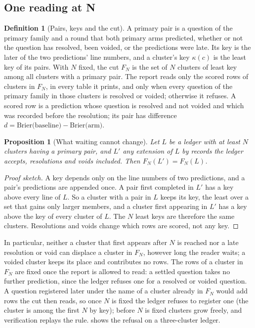\documentclass[11pt]{article}
\theoremstyle{plain}
\newtheorem{proposition}[theorem]{Proposition}
\theoremstyle{definition}
\newtheorem{definition}[theorem]{Definition}
\theoremstyle{remark}
\begin{document}
\subsection{One reading at N}\label{sec:cut}

\begin{definition}[Pairs, keys and the cut]
A primary pair is a question of the primary family and a round that both primary arms predicted,
whether or not the question has resolved, been voided, or the predictions were late. Its key is the
later of the two predictions' line numbers, and a cluster's key $\kappa(c)$ is the least key of its
pairs. With $N$ fixed, the cut $F_N$ is the set of $N$ clusters of least key among all clusters
with a primary pair. The report reads only the scored rows of clusters in $F_N$, in every table it
prints, and only when every question of the primary family in those clusters is resolved or voided;
otherwise it refuses. A scored row is a prediction whose question is resolved and not voided and
which was recorded before the resolution; its pair has difference
$d = \text{Brier(baseline)} - \text{Brier(arm)}$.
\end{definition}

\begin{proposition}[What waiting cannot change]\label{prop:cut}
Let $L$ be a ledger with at least $N$ clusters having a primary pair, and $L'$ any extension of
$L$ by records the ledger accepts, resolutions and voids included. Then $F_N(L') = F_N(L)$.
\end{proposition}
\begin{proof}[Proof sketch]
A key depends only on the line numbers of two predictions, and a pair's predictions are appended
once. A pair first completed in $L'$ has a key above every line of $L$. So a cluster with a pair in
$L$ keeps its key, the least over a set that gains only larger members, and a cluster first
appearing in $L'$ has a key above the key of every cluster of $L$. The $N$ least keys are
therefore the same clusters. Resolutions and voids change which rows are scored, not any key.
\end{proof}

In particular, neither a cluster that first appears after $N$ is reached nor a late resolution or
void can displace a cluster in $F_N$, however long the reader waits; a voided cluster keeps its
place and contributes no rows. The rows of a cluster in $F_N$ are fixed once the report is allowed
to read: a settled question takes no further prediction, since the ledger refuses one for a
resolved or voided question. A question registered later under the name of a cluster already in $F_N$ would add rows
the cut then reads, so once $N$ is fixed the ledger refuses to register one (the cluster is
among the first $N$ by key); before $N$ is fixed clusters grow freely, and verification replays
the rule.  shows the refusal on a three-cluster ledger.
\end{document}
